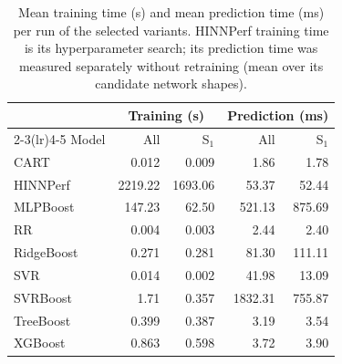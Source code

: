 \begin{table}[htbp]
\centering
\scriptsize
\caption{Mean training time (s) and mean prediction time (ms) per run of the selected variants. HINNPerf training time is its hyperparameter search; its prediction time was measured separately without retraining (mean over its candidate network shapes).}
\label{tab:rq3-time}
\begin{tabular}{lrrrr}
\toprule
 & \multicolumn{2}{c}{Training (s)} & \multicolumn{2}{c}{Prediction (ms)} \\
\cmidrule(lr){2-3}\cmidrule(lr){4-5}
Model & All & S$_1$ & All & S$_1$ \\
\midrule
CART & 0.012 & 0.009 & 1.86 & 1.78 \\
HINNPerf & 2219.22 & 1693.06 & 53.37 & 52.44 \\
MLPBoost & 147.23 & 62.50 & 521.13 & 875.69 \\
RR & 0.004 & 0.003 & 2.44 & 2.40 \\
RidgeBoost & 0.271 & 0.281 & 81.30 & 111.11 \\
SVR & 0.014 & 0.002 & 41.98 & 13.09 \\
SVRBoost & 1.71 & 0.357 & 1832.31 & 755.87 \\
TreeBoost & 0.399 & 0.387 & 3.19 & 3.54 \\
XGBoost & 0.863 & 0.598 & 3.72 & 3.90 \\
\bottomrule
\end{tabular}
\end{table}
